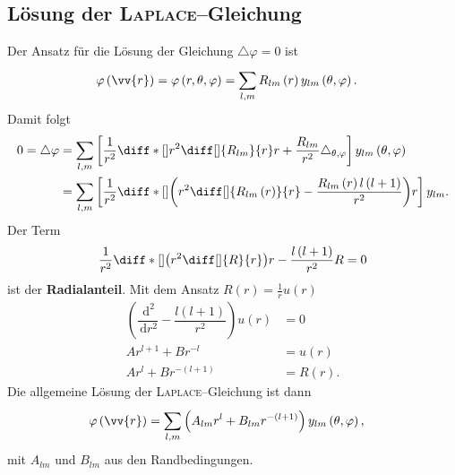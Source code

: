 \documentclass[a4paper,12pt]{article}
\newcommand{\td}{\,\text{d}}
\numberwithin{equation}{section}
\begin{document}
\subsection{Lösung der \textsc{Laplace}--Gleichung}
Der Ansatz für die Lösung der Gleichung $\triangle \varphi =0$ ist
\begin{align} 
        \varphi \left(\vv{r}\right)&=\varphi \left(r,\theta ,\varphi \right)=\sum_{l,m}^{}R_{l m}\left(r\right)y_{l m}\left(\theta ,\varphi \right)
.\end{align} 
Damit folgt
\begin{align} 
        0=\triangle \varphi &=\sum_{l,m}^{}\left[\dfrac{1}{r^2}\diff*[]{r^2\diff[]{R_{l m}}{r}}{r}+\dfrac{R_{l m}}{r^2}\triangle _{\theta ,\varphi }\right]y_{l m}\left(\theta ,\varphi \right)\\
                            &=\sum_{l,m}^{}\left[\dfrac{1}{r^2}\diff*[]{\left(r^2\diff[]{R_{l m}\left(r\right)}{r}-\dfrac{R_{l m}\left(r\right)l\left(l+1\right)}{r^2}\right)}{r}\right]y_{l m}
.\end{align} 
Der Term 
\begin{align} 
        \dfrac{1}{r^2}\diff*[]{\left(r^2\diff[]{R}{r}\right)}{r}-\dfrac{l\left(l+1\right)}{r^2}R=0
\end{align} 
ist der \textbf{Radialanteil}. Mit dem Ansatz $R\left(r\right)=\tfrac{1}{r}u\left(r\right)$ 
\begin{align} 
        \left(\dfrac{\td ^2}{\td r^2}-\dfrac{l\left(l+1\right)}{r^2}\right)u\left(r\right)&=0\\
        Ar^{l+1}+Br^{-l}&=u\left(r\right)\\
        Ar^l+Br^{-\left(l+1\right)}&=R\left(r\right)
.\end{align} 
Die allgemeine Lösung der \textsc{Laplace}--Gleichung ist dann
\begin{align} 
        \varphi \left(\vv{r}\right)&=\sum_{l,m}^{}\left(A_{l m}r^l+B_{l m}r^{-\left(l+1\right)}\right)y_{l m}\left(\theta ,\varphi \right)
,\end{align} 
mit $A_{l m}$ und $B_{l m}$ aus den Randbedingungen.
\end{document}
